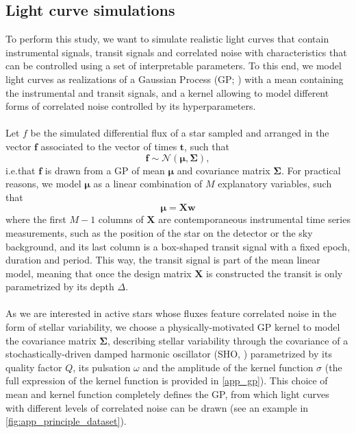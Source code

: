 \documentclass[modern]{aastex631}
\begin{document}
\subsection{Light curve simulations}\label{light_curves_simulations}
To perform this study, we want to simulate realistic light curves that contain instrumental signals, transit signals and correlated noise with characteristics that can be controlled using a set of interpretable parameters. To this end, we model light curves as realizations of a Gaussian Process (GP; \citealt{Rasmussen2005}) with a mean containing the instrumental and transit signals, and a kernel allowing to model different forms of correlated noise controlled by its hyperparameters.\\\\
Let $f$ be the simulated differential flux of a star sampled and arranged in the vector $\bm{f}$ associated to the vector of times $\bm{t}$, such that
\begin{equation*}
    \bm{f} \sim \mathcal{N}(\bm{\mu}, \bm{\Sigma}),
\end{equation*}
i.e.\;that $\bm{f}$ is drawn from a GP of mean $\bm{\mu}$ and covariance matrix $\bm{\Sigma}$. For practical reasons, we model $\bm{\mu}$ as a linear combination of $M$ explanatory variables, such that
\begin{equation}\label{eq:linear_model}
    \bm{\mu} = \bm{X w}
\end{equation}
where the first $M-1$ columns of $\bm{X}$ are contemporaneous instrumental time series measurements, such as the position of the star on the detector or the sky background, and its last column is a box-shaped transit signal with a fixed epoch, duration and period. This way, the transit signal is part of the mean linear model, meaning that once the design matrix $\bm{X}$ is constructed the transit is only parametrized by its depth $\Delta$.\\\\
As we are interested in active stars whose fluxes feature correlated noise in the form of stellar variability, we choose a physically-motivated GP kernel to model the covariance matrix $\bm{\Sigma}$, describing stellar variability through the covariance of a stochastically-driven damped harmonic oscillator (SHO, \citealt{celerite, celerite2}) parametrized by its quality factor $Q$, its pulsation $\omega$ and the amplitude of the kernel function $\sigma$ (the full expression of the kernel function is provided in \autoref{app_gp}). This choice of mean and kernel function completely defines the GP, from which light curves with different levels of correlated noise can be drawn (see an example in \autoref{fig:app_principle_dataset}).
\end{document}
